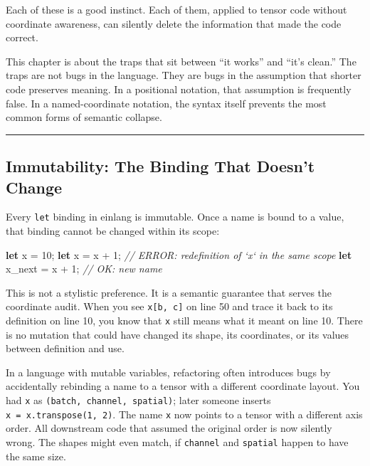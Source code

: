 \documentclass[11pt,]{article}
\newenvironment{Shaded}{}{}
\newcommand{\CommentTok}[1]{\textcolor[rgb]{0.38,0.63,0.69}{\textit{#1}}}
\newcommand{\DecValTok}[1]{\textcolor[rgb]{0.25,0.63,0.44}{#1}}
\newcommand{\KeywordTok}[1]{\textcolor[rgb]{0.00,0.44,0.13}{\textbf{#1}}}
\newcommand{\NormalTok}[1]{#1}
\begin{document}
Each of these is a good instinct. Each of them, applied to tensor code
without coordinate awareness, can silently delete the information that
made the code correct.

This chapter is about the traps that sit between ``it works'' and ``it's
clean.'' The traps are not bugs in the language. They are bugs in the
assumption that shorter code preserves meaning. In a positional
notation, that assumption is frequently false. In a named-coordinate
notation, the syntax itself prevents the most common forms of semantic
collapse.

\begin{center}\rule{0.5\linewidth}{0.4pt}\end{center}

\hypertarget{immutability-the-binding-that-doesnt-change}{%
\subsection{Immutability: The Binding That Doesn't
Change}\label{immutability-the-binding-that-doesnt-change}}

Every \texttt{let} binding in einlang is immutable. Once a name is bound
to a value, that binding cannot be changed within its scope:

\begin{Shaded}
\begin{Highlighting}[]
\KeywordTok{let}\NormalTok{ x = }\DecValTok{10}\NormalTok{;}
\KeywordTok{let}\NormalTok{ x = x + }\DecValTok{1}\NormalTok{;   }\CommentTok{// ERROR: redefinition of `x` in the same scope}
\KeywordTok{let}\NormalTok{ x_next = x + }\DecValTok{1}\NormalTok{;   }\CommentTok{// OK: new name}
\end{Highlighting}
\end{Shaded}

This is not a stylistic preference. It is a semantic guarantee that
serves the coordinate audit. When you see \texttt{x{[}b,\ c{]}} on line
50 and trace it back to its definition on line 10, you know that
\texttt{x} still means what it meant on line 10. There is no mutation
that could have changed its shape, its coordinates, or its values
between definition and use.

In a language with mutable variables, refactoring often introduces bugs
by accidentally rebinding a name to a tensor with a different coordinate
layout. You had \texttt{x} as \texttt{(batch,\ channel,\ spatial)};
later someone inserts \texttt{x\ =\ x.transpose(1,\ 2)}. The name
\texttt{x} now points to a tensor with a different axis order. All
downstream code that assumed the original order is now silently wrong.
The shapes might even match, if \texttt{channel} and \texttt{spatial}
happen to have the same size.
\end{document}
